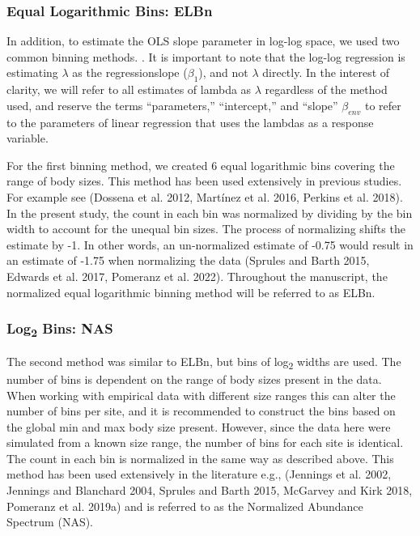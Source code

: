\documentclass[
]{article}
\begin{document}
\hypertarget{equal-logarithmic-bins-elbn}{%
\subsubsection{Equal Logarithmic Bins:
ELBn}\label{equal-logarithmic-bins-elbn}}

In addition, to estimate the OLS slope parameter in log-log space, we
used two common binning methods. . It is important to note that the
log-log regression is estimating \(\lambda\) as the regressionslope
(\(\beta_{1}\)), and not \(\lambda\) directly. In the interest of
clarity, we will refer to all estimates of lambda as \(\lambda\)
regardless of the method used, and reserve the terms ``parameters,''
``intercept,'' and ``slope'' \(\beta_{env}\) to refer to the parameters
of linear regression that uses the lambdas as a response variable.

For the first binning method, we created 6 equal logarithmic bins
covering the range of body sizes. This method has been used extensively
in previous studies. For example see (Dossena et al. 2012, Martínez et
al. 2016, Perkins et al. 2018). In the present study, the count in each
bin was normalized by dividing by the bin width to account for the
unequal bin sizes. The process of normalizing shifts the estimate by -1.
In other words, an un-normalized estimate of -0.75 would result in an
estimate of -1.75 when normalizing the data (Sprules and Barth 2015,
Edwards et al. 2017, Pomeranz et al. 2022). Throughout the manuscript,
the normalized equal logarithmic binning method will be referred to as
ELBn.

\hypertarget{log2-bins-nas}{%
\subsubsection{\texorpdfstring{Log\textsubscript{2} Bins:
NAS}{Log2 Bins: NAS}}\label{log2-bins-nas}}

The second method was similar to ELBn, but bins of log\textsubscript{2}
widths are used. The number of bins is dependent on the range of body
sizes present in the data. When working with empirical data with
different size ranges this can alter the number of bins per site, and it
is recommended to construct the bins based on the global min and max
body size present. However, since the data here were simulated from a
known size range, the number of bins for each site is identical. The
count in each bin is normalized in the same way as described above. This
method has been used extensively in the literature e.g., (Jennings et
al. 2002, Jennings and Blanchard 2004, Sprules and Barth 2015, McGarvey
and Kirk 2018, Pomeranz et al. 2019a) and is referred to as the
Normalized Abundance Spectrum (NAS).
\end{document}
